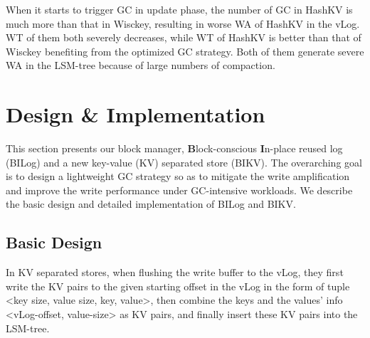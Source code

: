 \documentclass[sigconf]{acmart}
\begin{document}
When it starts to trigger GC in update phase, the number of GC in HashKV is much more than that in Wisckey, resulting in worse WA of HashKV in the vLog. WT of them both severely decreases, while WT of HashKV is better than that of Wisckey benefiting from the optimized GC strategy. Both of them generate severe WA in the LSM-tree because of large numbers of compaction. 



\section{Design \& Implementation}
This section presents our block manager, \textbf{B}lock-conscious \textbf{I}n-place reused log (BILog) and a new key-value (KV) separated store (BIKV). The overarching goal is to design a lightweight GC strategy so as to mitigate the write amplification and improve the write performance under GC-intensive workloads. We describe the basic design and detailed implementation of BILog and BIKV.

\subsection{Basic Design} \label{bd}
In KV separated stores, when flushing the write buffer to the vLog, they first write the KV pairs to the given starting offset in the vLog in the form of tuple \textless key size, value size, key, value\textgreater, then combine the keys and the values’ info \textless vLog-offset, value-size\textgreater{} as KV pairs, and finally insert these KV pairs into the LSM-tree.
\end{document}
